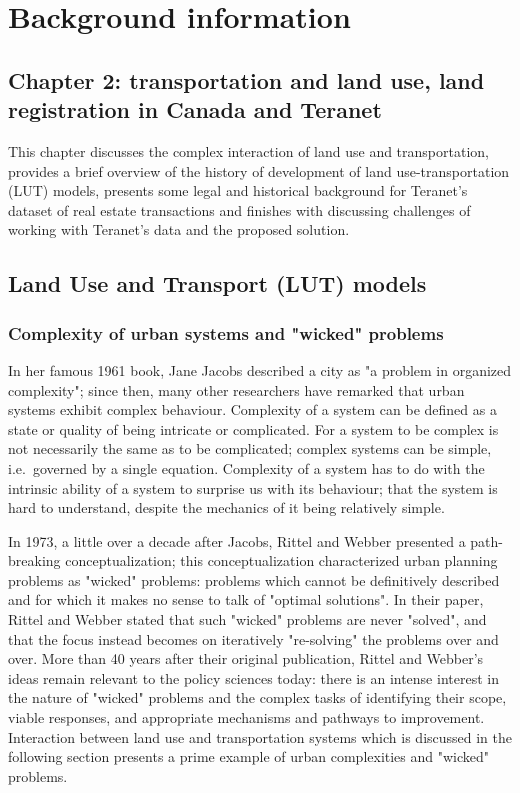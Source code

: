 \chapter[Background information]{Background information} \label{ch:background}

\section{Chapter 2: transportation and land use, land registration in Canada and Teranet} \label{sec:intro_background}

This chapter discusses the complex interaction of land use and transportation, provides a brief overview of the history of development of land use-transportation (LUT) models, presents some legal and historical background for Teranet's dataset of real estate transactions and finishes with discussing challenges of working with Teranet's data and the proposed solution.

\section{Land Use and Transport (LUT) models} \label{sec:evolution_of_models_of_urban_systems}

\subsection{Complexity of urban systems and "wicked" problems} \label{subsec:complexity_and_wicked_problems}

In her famous 1961 book, Jane Jacobs\cite{Jacobs1961} described a city as "a problem in organized complexity";
since then, many other researchers have remarked that urban systems exhibit complex behaviour\cite{Batty2008, Bettencourt2013}.
Complexity of a system can be defined as a state or quality of being intricate or complicated.
For a system to be complex is not necessarily the same as to be complicated;
complex systems can be simple, i.e.\ governed by a single equation.
Complexity of a system has to do with the intrinsic ability of a system to surprise us with its behaviour;
that the system is hard to understand, despite the mechanics of it being relatively simple.

In 1973, a little over a decade after Jacobs, Rittel and Webber\cite{Rittel1973} presented a path-breaking conceptualization;
this conceptualization characterized urban planning problems as "wicked" problems: problems which cannot be definitively described and for which it makes no sense to talk of "optimal solutions".
In their paper, Rittel and Webber stated that such "wicked" problems are never "solved", and that the focus instead becomes on iteratively "re-solving" the problems over and over.
More than 40 years after their original publication, Rittel and Webber's ideas remain relevant to the policy sciences today: there is an intense interest in the nature of "wicked" problems and the complex tasks of identifying their scope, viable responses, and appropriate mechanisms and pathways to improvement\cite{Crowley2017}.
Interaction between land use and transportation systems which is discussed in the following section presents a prime example of urban complexities and "wicked" problems.

